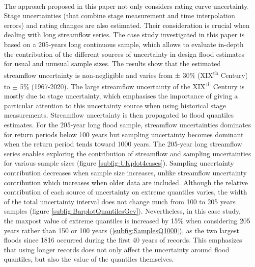 \documentclass[11pt]{article}
\begin{document}
    \paragraph{}
    The approach proposed in this paper not only considers rating curve uncertainty. Stage uncertainties (that combine stage measurement and time interpolation errors) and rating changes are also estimated. Their consideration is crucial when dealing with long streamflow series. The case study investigated in this paper is based on a 205-years long continuous sample, which allows to evaluate in-depth the contribution of the different sources of uncertainty in design flood estimates for usual and unusual sample sizes. The results show that the estimated streamflow uncertainty is non-negligible and varies from $\pm$ 30\% (XIX\textsuperscript{th} Century) to $\pm$ 5\% (1967-2020). The large streamflow uncertainty of the XIX\textsuperscript{th} Century is mostly due to stage uncertainty, which emphasises the importance of giving a particular attention to this uncertainty source when using historical stage measurements. Streamflow uncertainty is then propagated to flood quantiles estimates. For the 205-year long flood sample, streamflow uncertainties dominates for return periods below 100 years but sampling uncertainty becomes dominant when the return period tends toward 1000 years. The 205-year long streamflow series enables exploring the contribution of streamflow and sampling uncertainties for various sample sizes (figure \ref{subfig:UKplot4cases}). Sampling uncertainty contribution decreases when sample size increases, unlike streamflow uncertainty contribution which increases when older data are included. Although the relative contribution of each source of uncertainty on extreme quantiles varies, the width of the total uncertainty interval does not change much from 100 to 205 years samples (figure \ref{subfig:BarplotQuantilesGev}). Nevertheless, in this case study, the maxpost value of extreme quantiles is increased by 15\% when considering 205 years rather than 150 or 100 years (\ref{subfig:SamplesQ1000}), as the two largest floods since 1816 occurred during the first 40 years of records. This emphasizes that using longer records does not only affect the uncertainty around flood quantiles, but also the value of the quantiles themselves. 
    
\end{document}
